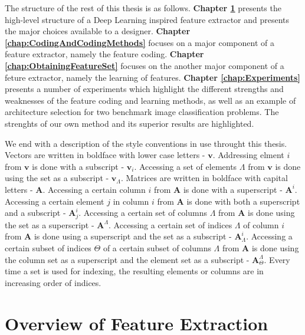 \documentclass[12pt,a4paper,oneside,english]{UPBThesis}
\begin{document}
The structure of the rest of this thesis is as follows. \textbf{Chapter \ref{chap:OverviewFeatureExtraction}} presents the high-level structure of a Deep Learning inspired feature extractor and presents the major choices available to a designer. \textbf{Chapter \ref{chap:CodingAndCodingMethods}} focuses on a major component of a feature extractor, namely the feature coding. \textbf{Chapter \ref{chap:ObtainingFeatureSet}} focuses on the another major component of a feture extractor, namely the learning of features. \textbf{Chapter \ref{chap:Experiments}} presents a number of experiments which highlight the different strengths and weaknesses of the feature coding and learning methods, as well as an example of architecture selection for two benchmark image classification problems. The strenghts of our own method and its superior results are highlighted.

We end with a description of the style conventions in use throught this thesis. Vectors are written in boldface with lower case letters - $\textbf{v}$. Addressing elment $i$ from $\textbf{v}$ is done with a subscript - $\textbf{v}_i$. Accessing a set of elements $\Lambda$ from $\textbf{v}$ is done using the set as a subscript - $\textbf{v}_\Lambda$. Matrices are written in boldface with capital letters - $\textbf{A}$. Accessing a certain column $i$ from $\textbf{A}$ is done with a superscript - $\textbf{A}^i$. Accessing a certain element $j$ in column $i$ from $\textbf{A}$ is done with both a superscript and a subscript - $\textbf{A}^i_j$. Accessing a certain set of columns $\Lambda$ from $\textbf{A}$ is done using the set as a superscript - $\textbf{A}^\Lambda$. Accessing a certain set of indices $\Lambda$ of column $i$ from $\textbf{A}$ is done using a superscript and the set as a subscript - $\textbf{A}^i_\Lambda$. Accessing a certain subset of indices $\Theta$ of a certain subset of columns $\Lambda$ from $\textbf{A}$ is done using the column set as a superscript and the element set as a subscript - $\textbf{A}^\Lambda_\Theta$. Every time a set is used for indexing, the resulting elements or columns are in increasing order of indices.

\chapter{Overview of Feature Extraction}
\label{chap:OverviewFeatureExtraction}
\end{document}
